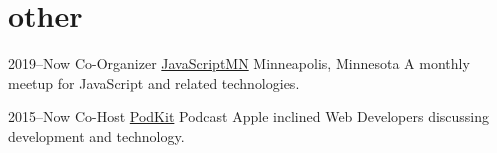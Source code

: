 \documentclass[]{cv-style} %
\begin{document}

\section{other}

\begin{entrylist}


\entry
{2019--Now}
{Co-Organizer {\normalfont \href{https://javascriptmn.com}{JavaScriptMN}}}
{Minneapolis, Minnesota}
{A monthly meetup for JavaScript and related technologies.}


\entry
{2015--Now}
{Co-Host {\normalfont \href{http://thenexus.tv/category/pk/}{PodKit}}}
{Podcast}
{Apple inclined Web Developers discussing development and technology.}


\end{entrylist}
\end{document}

